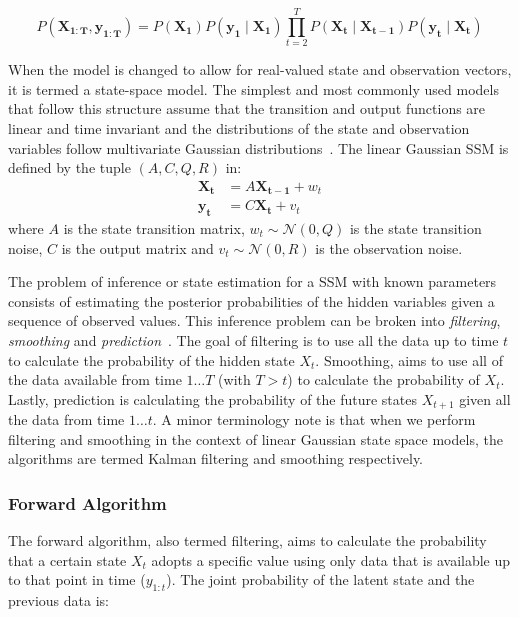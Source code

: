 \begin{equation}\label{eq:joint_prob_ssm}
  P(\mathbf{X_{1:T}}, \mathbf{y_{1:T}}) = P(\mathbf{X_1})P(\mathbf{y_1} \mid \mathbf{X_1}) \prod\limits_{t=2}^{T} P(\mathbf{X_t} \mid \mathbf{X_{t-1}} ) P( \mathbf{y_t} \mid \mathbf{X_{t}} )
\end{equation}

When the model is changed to allow for real-valued state and observation vectors, it is termed a state-space model. The simplest and most commonly used models that follow this structure assume that the transition and output functions are linear and time invariant and the distributions of the state and observation variables follow multivariate Gaussian distributions~\citep{ghahramani2000variational}. The linear Gaussian SSM is defined by the tuple $(A, C, Q, R)$ in:
\begin{equation}\label{eq:hmm_first_order}
  \begin{split}
      \mathbf{X_t} &= A\mathbf{X_{t-1}} + w_t \\
      \mathbf{y_t} &= C\mathbf{X_t} + v_t
  \end{split}
\end{equation}
where $A$ is the state transition matrix, $w_t \sim \mathcal{N}(0,Q)$ is the state transition noise, $C$ is the output matrix and $v_t \sim \mathcal{N}(0,R)$ is the observation noise.

The problem of inference or state estimation for a SSM with known parameters consists of estimating the posterior probabilities of the hidden variables given a sequence of observed values. This inference problem can be broken into \textit{filtering}, \textit{smoothing} and \textit{prediction}~\citep{shumway2000time}. The goal of filtering is to use all the data up to time $t$ to calculate the probability of the hidden state $X_t$. Smoothing, aims to use all of the data available from time $1 \hdots T$ (with $T > t$) to calculate the probability of $X_t$. Lastly, prediction is calculating the probability of the future states $X_{t+1}$ given all the data from time $1 \hdots t$. A minor terminology note is that when we perform filtering and smoothing in the context of linear Gaussian state space models, the algorithms are termed Kalman filtering and smoothing respectively.

\subsubsection{Forward Algorithm}
The forward algorithm, also termed filtering, aims to calculate the probability that a certain state $X_t$ adopts a specific value using only data that is available up to that point in time ($y_{1:t}$). The joint probability of the latent state and the previous data is:

